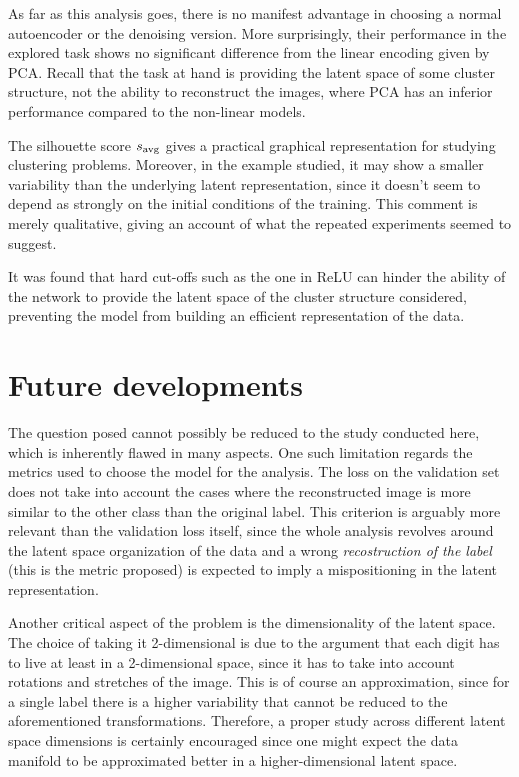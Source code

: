 \documentclass[twocolumn,gsifonts,twoside]{gsipaper}
\begin{document}
As far as this analysis goes, there is no manifest advantage in choosing a normal autoencoder or the denoising version. More surprisingly, their performance in the explored task shows no significant difference from the linear encoding given by PCA. Recall that the task at hand is providing the latent space of some cluster structure, not the ability to reconstruct the images, where PCA has an inferior performance compared to the non-linear models.

The silhouette score $s_\textup{avg}$ gives a practical graphical representation for studying clustering problems. Moreover, in the example studied, it may show a smaller variability than the underlying latent representation, since it doesn't seem to depend as strongly on the initial conditions of the training. This comment is merely qualitative, giving an account of what the repeated experiments seemed to suggest.

It was found that hard cut-offs such as the one in ReLU can hinder the ability of the network to provide the latent space of the cluster structure considered, preventing the model from building an efficient representation of the data. 


\section{Future developments}
The question posed cannot possibly be reduced to the study conducted here, which is inherently flawed in many aspects. One such limitation regards the metrics used to choose the model for the analysis. The loss on the validation set does not take into account the cases where the reconstructed image is more similar to the other class than the original label. This criterion is arguably more relevant than the validation loss itself, since the whole analysis revolves around the latent space organization of the data and a wrong \emph{recostruction of the label} (this is the metric proposed) is expected to imply a mispositioning in the latent representation.

Another critical aspect of the problem is the dimensionality of the latent space. The choice of taking it 2-dimensional is due to the argument that each digit has to live at least in a 2-dimensional space, since it has to take into account rotations and stretches of the image. This is of course an approximation, since for a single label there is a higher variability that cannot be reduced to the aforementioned transformations. Therefore, a proper study across different latent space dimensions is certainly encouraged since one might expect the data manifold to be approximated better in a higher-dimensional latent space.
\end{document}
